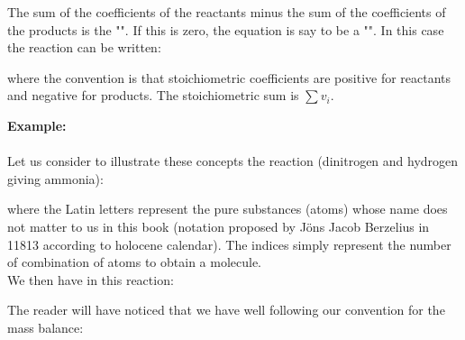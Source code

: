 	The sum of the coefficients of the reactants minus the sum of the coefficients of the products is the "\label{stoichiometric sum}". If this is zero, the equation is say to be a "". In this case the reaction can be written:
	
	where the convention is that stoichiometric coefficients are positive for reactants and negative for products. The stoichiometric sum is $\sum v_i$.
	
	\begin{tcolorbox}[colframe=black,colback=white,sharp corners]
	\textbf{{\Large {}}Example:}\\\\
	Let us consider to illustrate these concepts the reaction (dinitrogen and hydrogen giving ammonia):
	
	where the Latin letters represent the pure substances (atoms) whose name does not matter to us in this book (notation proposed by Jöns Jacob Berzelius in 11813 according to holocene calendar). The indices simply represent the number of combination of atoms to obtain a molecule. \\

	We then have in this reaction:
	
	The reader will have noticed that we have well following our convention for the mass balance:
	
	\end{tcolorbox}
	
